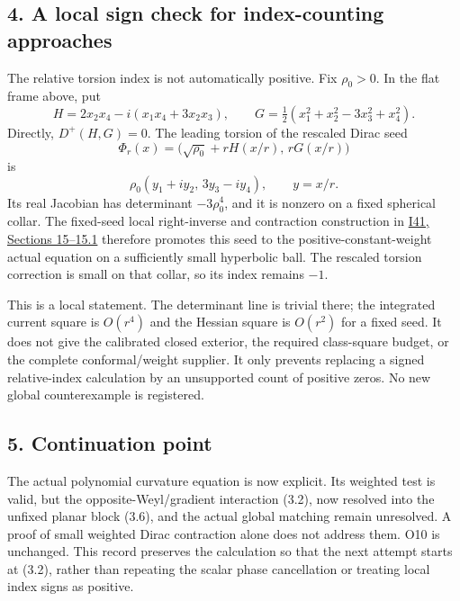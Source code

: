 \documentclass[
  10pt,
]{article}
\begin{document}
\hypertarget{a-local-sign-check-for-index-counting-approaches}{%
\subsection{4. A local sign check for index-counting
approaches}\label{a-local-sign-check-for-index-counting-approaches}}

The relative torsion index is not automatically positive. Fix
\(\rho_0>0\). In the flat frame above, put \[
 H=2x_2x_4-i(x_1x_4+3x_2x_3),\qquad
 G=\tfrac12(x_1^2+x_2^2-3x_3^2+x_4^2).
\] Directly, \(D^+(H,G)=0\). The leading torsion of the rescaled Dirac
seed \[
 \Phi_r(x)=\bigl(\sqrt{\rho_0}+rH(x/r),\,rG(x/r)\bigr)
\] is \[
 \rho_0(y_1+iy_2,\,3y_3-iy_4),\qquad y=x/r.
\] Its real Jacobian has determinant \(-3\rho_0^4\), and it is nonzero
on a fixed spherical collar. The fixed-seed local right-inverse and
contraction construction in
\href{20260927_conformal_separation_and_zero_end.md}{I41, Sections
15--15.1} therefore promotes this seed to the positive-constant-weight
actual equation on a sufficiently small hyperbolic ball. The rescaled
torsion correction is small on that collar, so its index remains \(-1\).

This is a local statement. The determinant line is trivial there; the
integrated current square is \(O(r^4)\) and the Hessian square is
\(O(r^2)\) for a fixed seed. It does not give the calibrated closed
exterior, the required class-square budget, or the complete
conformal/weight supplier. It only prevents replacing a signed
relative-index calculation by an unsupported count of positive zeros. No
new global counterexample is registered.

\hypertarget{continuation-point}{%
\subsection{5. Continuation point}\label{continuation-point}}

The actual polynomial curvature equation is now explicit. Its weighted
test is valid, but the opposite-Weyl/gradient interaction (3.2), now
resolved into the unfixed planar block (3.6), and the actual global
matching remain unresolved. A proof of small weighted Dirac contraction
alone does not address them. O10 is unchanged. This record preserves the
calculation so that the next attempt starts at (3.2), rather than
repeating the scalar phase cancellation or treating local index signs as
positive.
\end{document}

